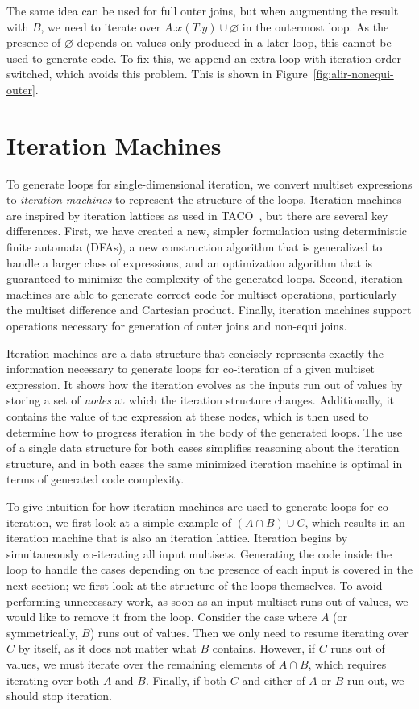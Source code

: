 \documentclass[acmsmall,screen,nonacm]{acmart}\settopmatter{printfolios=true,printccs=false,printacmref=false}
\begin{document}
The same idea can be used for full outer joins, but when augmenting
the result with $B$, we need to iterate over
$A.x(T.y) \cup \varnothing$ in the outermost loop. As the presence of
$\varnothing$ depends on values only produced in a later loop, this cannot
be used to generate code. To fix this, we append an extra loop with iteration
order switched, which avoids this problem. This is shown in Figure~\ref{fig:alir-nonequi-outer}.


\section{Iteration Machines}
\label{sec:iteration-machines}

To generate loops for single-dimensional iteration, we convert
multiset expressions to \emph{iteration machines} to represent the
structure of the loops.
Iteration machines are inspired by iteration lattices as used in TACO~\cite{kjolstad2017,henry2017}, but there are several key differences. First, we have created a new, simpler formulation using deterministic finite automata (DFAs), a new construction algorithm that is generalized to handle a larger class of expressions, and an optimization algorithm that is guaranteed to minimize the complexity of the generated loops. Second, iteration machines are able to generate correct code for multiset operations, particularly the multiset difference and Cartesian product. Finally, iteration machines support operations necessary for generation of outer joins and non-equi joins.

Iteration machines are a data structure that concisely represents exactly the information necessary to generate loops for co-iteration of a given multiset expression. It shows how the iteration evolves as the inputs run out of values by storing a set of \emph{nodes} at which the iteration structure changes. Additionally, it contains the value of the expression at these nodes, which is then used to determine how to progress iteration in the body of the generated loops. The use of a single data structure for both cases simplifies reasoning about the iteration structure, and in both cases the same minimized iteration machine is optimal in terms of generated code complexity.

To give intuition for how iteration machines are used to generate
loops for co-iteration,
we first look at a simple example of $(A \cap B) \cup C$, which results in an iteration machine that is also an iteration lattice.
Iteration begins by simultaneously co-iterating all input multisets.
Generating the code inside the loop to handle the cases depending on
the presence of each input is covered in the next section; we first
look at the structure of the loops themselves.
To avoid performing unnecessary work, as soon as an input multiset
runs out of values, we would like to remove it from the loop.
Consider the case where $A$ (or symmetrically, $B$) runs out of
values. Then we only need to resume iterating over $C$ by itself,
as it does not matter what $B$ contains. However, if $C$ runs out of
values, we must iterate over the remaining elements of $A \cap B$,
which requires iterating over both $A$ and $B$. Finally, if both
$C$ and either of $A$ or $B$ run out, we should stop iteration.
\end{document}
